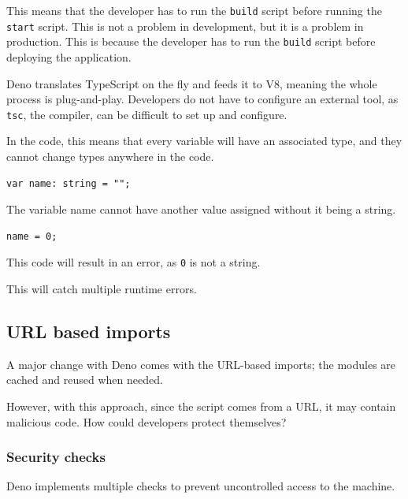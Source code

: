 \documentclass[10pt,journal,compsoc]{IEEEtran}
\begin{document}
This means that the developer has to run the \verb|build| script before running the \verb|start| script. This is not a problem in development, but it is a problem in production. This is because the developer has to run the \verb|build| script before deploying the application.

Deno translates TypeScript on the fly and feeds it to V8, meaning the whole process is plug-and-play. Developers do not have to configure an external tool, as \verb|tsc|, the compiler, can be difficult to set up and configure.

In the code, this means that every variable will have an associated type, and they cannot change types anywhere in the code.

\begin{lstlisting}
var name: string = "";
    \end{lstlisting}

The variable name cannot have another value assigned without it being a string.

\begin{lstlisting}
name = 0;
    \end{lstlisting}

This code will result in an error, as \verb|0| is not a string.

This will catch multiple runtime errors.

\subsection{URL based imports}

A major change with Deno comes with the URL-based imports; the modules are cached and reused when needed.

However, with this approach, since the script comes from a URL, it may contain malicious code. How could developers protect themselves?

\subsubsection{Security checks}

Deno implements multiple checks to prevent uncontrolled access to the machine. \cite{DenoSec}
\end{document}
